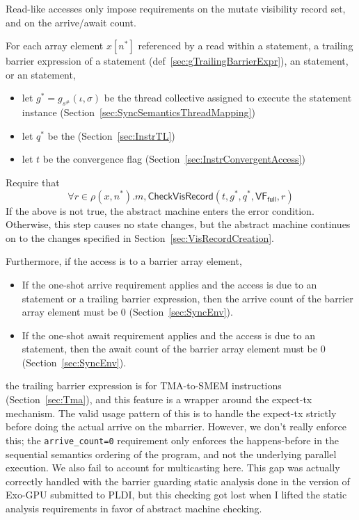 

Read-like accesses only impose requirements on the mutate visibility record set, and on the arrive/await count.

For each array element $x[n^*]$ referenced by a read within a statement, a trailing barrier expression of a statement (def~\ref{sec:gTrailingBarrierExpr}), an  statement, or an  statement,
\begin{itemize}
  \item let $g^* = g_{s^\#}(\iota, \sigma)$ be the thread collective assigned to execute the statement instance (Section~\ref{sec:SyncSemanticsThreadMapping})
  \item let $q^*$ be the  (Section~\ref{sec:InstrTL})
  \item let $t$ be the convergence flag (Section~\ref{sec:InstrConvergentAccess})
\end{itemize}
Require that
\begin{equation*}
    \forall r \in \rho(x, n^*).m, \mathsf{CheckVisRecord}(t, g^*, q^*, \mathsf{VF_{full}}, r)
\end{equation*}
If the above is not true, the abstract machine enters the error condition.
Otherwise, this step causes no state changes, but the abstract machine continues on to the changes specified in Section~\ref{sec:VisRecordCreation}.

Furthermore, if the access is to a barrier array element,
\begin{itemize}
  \item If the one-shot arrive requirement applies and the access is due to an  statement or a trailing barrier expression, then the arrive count of the barrier array element must be 0 (Section~\ref{sec:SyncEnv}).
  \item If the one-shot await requirement applies and the access is due to an  statement, then the await count of the barrier array element must be 0 (Section~\ref{sec:SyncEnv}).
\end{itemize}

 the trailing barrier expression is for TMA-to-SMEM instructions (Section~\ref{sec:Tma}), and this feature is a wrapper around the expect-tx mechanism.
The valid usage pattern of this is to handle the expect-tx strictly before doing the actual arrive on the mbarrier.
However, we don't really enforce this; the \texttt{arrive\_count=0} requirement only enforces the happens-before in the sequential semantics ordering of the program, and not the underlying parallel execution.
We also fail to account for multicasting here.
This gap was actually correctly handled with the barrier guarding static analysis done in the version of Exo-GPU submitted to PLDI, but this checking got lost when I lifted the static analysis requirements in favor of abstract machine checking.

